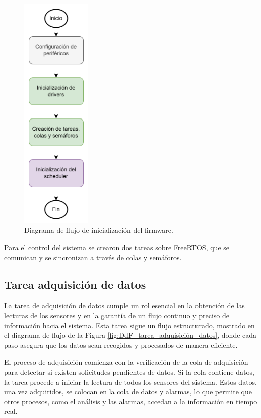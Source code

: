 \vspace{1cm}
\begin{figure}[htbp]
	\centering
	\includegraphics[width=0.3\textwidth, height=0.6\textheight]{./Figures/DdF_firmware.png}
	\caption{Diagrama de flujo de inicialización del firmware.}
	\label{fig:DdF_firmware}
\end{figure}
\vspace{1cm}

Para el control del sistema se crearon dos tareas sobre FreeRTOS, que se comunican
y se sincronizan a través de colas y semáforos.

\newpage

\subsection{Tarea adquisición de datos}

La tarea de adquisición de datos cumple un rol esencial en la obtención de las lecturas de los sensores y en la garantía de un flujo continuo y preciso de información hacia el sistema. Esta tarea sigue un flujo estructurado, mostrado en el diagrama de flujo de la Figura \ref{fig:DdF_tarea_adquisición_datos}, donde cada paso asegura que los datos sean recogidos y procesados de manera eficiente.

El proceso de adquisición comienza con la verificación de la cola de adquisición para detectar si existen solicitudes pendientes de datos. Si la cola contiene datos, la tarea procede a iniciar la lectura de todos los sensores del sistema. Estos datos, una vez adquiridos, se colocan en la cola de datos y alarmas, lo que permite que otros procesos, como el análisis y las alarmas, accedan a la información en tiempo real.


